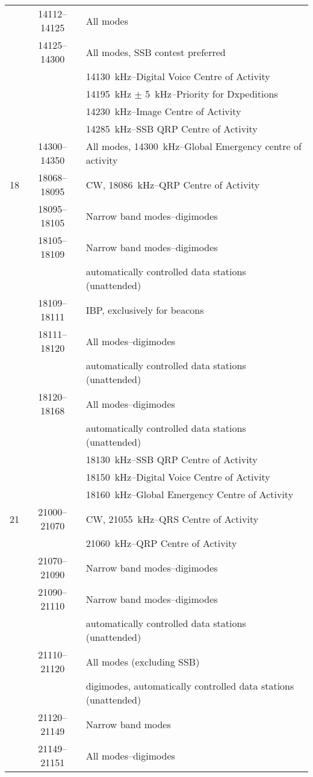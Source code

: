 \begin{xtabular}{lcl}
     & 14112--14125 & All modes\\
     & 14125--14300 & All modes, SSB contest preferred\\
     & & 14130~kHz--Digital Voice Centre of Activity\\
     & & 14195~kHz \(\pm\) 5~kHz--Priority for Dxpeditions\\
     & & 14230~kHz--Image Centre of Activity\\
     & & 14285~kHz--SSB QRP Centre of Activity\\
     & 14300--14350 & All modes, 14300~kHz--Global Emergency centre of activity\\
%
18   & 18068--18095 & CW, 18086~kHz--QRP Centre of Activity\\
     & 18095--18105 & Narrow band modes--digimodes\\
     & 18105--18109 & Narrow band modes--digimodes\\
     & & automatically controlled data stations (unattended)\\
     & 18109--18111 & IBP, exclusively for beacons\\
     & 18111--18120 & All modes--digimodes\\
     & & automatically controlled data stations (unattended)\\
     & 18120--18168 & All modes--digimodes\\
     & & automatically controlled data stations (unattended)\\
     & & 18130~kHz--SSB QRP Centre of Activity\\
     & & 18150~kHz--Digital Voice Centre of Activity\\
     & & 18160~kHz--Global Emergency Centre of Activity\\
%
21   & 21000--21070 & CW, 21055~kHz--QRS Centre of Activity\\
 & & 21060~kHz--QRP Centre of Activity\\
 & 21070--21090 & Narrow band modes--digimodes\\
     & 21090--21110 & Narrow band modes--digimodes\\
     & & automatically controlled data stations (unattended)\\
     & 21110--21120 & All modes (excluding SSB)\\
     & & digimodes, automatically controlled data stations (unattended)\\
     & 21120--21149 & Narrow band modes\\
     & 21149--21151 & All modes--digimodes\\

\end{xtabular}

